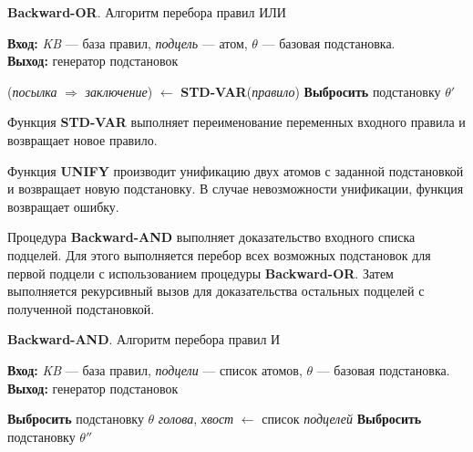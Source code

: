 \begin{algorithm}[h!]
  \caption{\textbf{Backward-OR}. Алгоритм перебора правил ИЛИ}
  \label{alg:backward-or}
  \hspace*{\algorithmicindent} \textbf{Вход:} \textit{KB} --- база правил, \textit{подцель} --- атом, $\theta$ --- базовая подстановка. \\
  \hspace*{\algorithmicindent} \textbf{Выход:} генератор подстановок
  \begin{algorithmic}[1]
    \State (\textit{посылка} $\Rightarrow$ \textit{заключение}) $\gets$ \textbf{STD-VAR}(\textit{правило})
      \State \textbf{Выбросить} подстановку $\theta'$
    \EndFor
  \EndFor
  \end{algorithmic}
\end{algorithm}

Функция \textbf{STD-VAR} выполняет переименование переменных входного правила и возвращает новое правило.

Функция \textbf{UNIFY} производит унификацию двух атомов с заданной подстановкой и возвращает новую подстановку. В случае невозможности унификации, функция возвращает ошибку.

Процедура \textbf{Backward-AND} выполняет доказательство входного списка подцелей. Для этого выполняется перебор всех возможных подстановок для первой подцели с использованием процедуры \textbf{Backward-OR}. Затем выполняется рекурсивный вызов для доказательства остальных подцелей с полученной подстановкой.

\begin{algorithm}[h!]
  \caption{\textbf{Backward-AND}. Алгоритм перебора правил И}
  \label{alg:backward-and}
  \hspace*{\algorithmicindent} \textbf{Вход:} \textit{KB} --- база правил, \textit{подцели} --- список атомов, $\theta$ --- базовая подстановка. \\
  \hspace*{\algorithmicindent} \textbf{Выход:} генератор подстановок
  \begin{algorithmic}[1]
     \Return
      \State \textbf{Выбросить} подстановку $\theta$
    \Else
      \State \textit{голова}, \textit{хвост} $\gets$ список \textit{подцелей}
          \State \textbf{Выбросить} подстановку $\theta''$
        \EndFor
      \EndFor
    \EndIf
  \end{algorithmic}
\end{algorithm}


